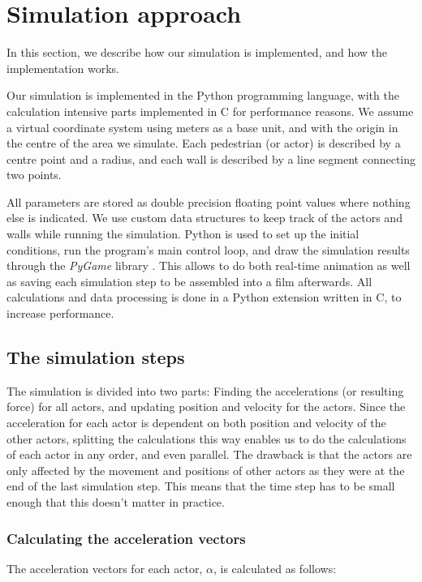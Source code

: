 \section{Simulation approach}
\label{sec:simulation}
In this section, we describe how our simulation is implemented, and how the 
implementation works.

Our simulation is implemented in the Python programming language, with the 
calculation intensive parts implemented in C for performance reasons. We 
assume a virtual coordinate system using meters as a base unit, and with the 
origin in the centre of the area we simulate. Each pedestrian (or actor) is 
described by a centre point and a radius, and each wall is described by a line 
segment connecting two points.

All parameters are stored as double precision floating point values where 
nothing else is indicated. We use custom data structures to keep track of the 
actors and walls while running the simulation. Python is used to set up the 
initial conditions, run the program's main control loop, and draw the 
simulation results through the \emph{PyGame} library \cite{pygame}. This 
allows to do both real-time animation as well as saving each simulation step 
to be assembled into a film afterwards. All calculations and data processing 
is done in a Python extension written in C, to increase performance.

\subsection{The simulation steps}
The simulation is divided into two parts: Finding the accelerations (or 
resulting force) for all actors, and updating position and velocity for the 
actors.  Since the acceleration for each actor is dependent on both position 
and velocity of the other actors, splitting the calculations this way enables 
us to do the calculations of each actor in any order, and even parallel. The 
drawback is that the actors are only affected by the movement and positions of 
other actors as they were at the end of the last simulation step. This means 
that the time step has to be small enough that this doesn't matter in 
practice.

\subsubsection{Calculating the acceleration vectors}
The acceleration vectors for each actor, $\alpha$, is calculated as follows:

